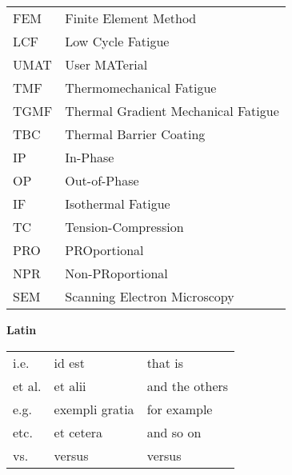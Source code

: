 \renewcommand\arraystretch{1.2}

\begin{table}[htbp]
  \centering
    \begin{tabular}{p{3cm}p{10.5cm}}
    FEM & Finite Element Method \\
    LCF & Low Cycle Fatigue \\
    UMAT & User MATerial \\
    TMF & Thermomechanical Fatigue \\
    TGMF & Thermal Gradient Mechanical Fatigue \\
    TBC & Thermal Barrier Coating \\
    IP & In-Phase \\
    OP & Out-of-Phase \\
    IF & Isothermal Fatigue \\
    TC & Tension-Compression \\
    PRO & PROportional \\
    NPR & Non-PRoportional \\
    SEM & Scanning Electron Microscopy \\
    \end{tabular}%
  \label{Tab:abbreviation}%
\end{table}%

\textbf{Latin}

\begin{table}[htbp]
  \centering
    \begin{tabular}{p{3cm}<{\raggedright}p{3cm}<{\raggedright}p{7cm}<{\raggedright}}
    i.e.      & id est             & that is \\
    et al.    & et alii            & and the others \\
    e.g.      & exempli gratia     & for example \\
    etc.      & et cetera          & and so on \\
    vs.       & versus             & versus \\
    \end{tabular}%
  \label{Tab:abbreviation_latin}%
\end{table}%
\renewcommand\arraystretch{1.0}